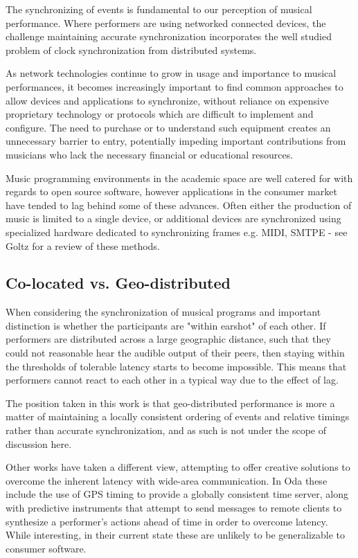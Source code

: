 \documentclass[11pt]{article} %
\theoremstyle{plain}
\theoremstyle{definition}
\begin{document}
The synchronizing of events is fundamental to our perception of musical
performance. Where performers are using networked connected devices, the
challenge maintaining accurate synchronization incorporates the well studied
problem of clock synchronization from distributed systems.

As network technologies continue to grow in usage and importance to musical
performances\cite{madgwick2015simple}, it becomes increasingly important to
find common approaches to allow devices and applications to synchronize, without
reliance on expensive proprietary technology or protocols which are difficult to
implement and configure. The need to purchase or to understand such equipment
creates an unnecessary barrier to entry, potentially impeding important
contributions from musicians who lack the necessary financial or educational
resources.

Music programming environments in the academic space are well catered for with
regards to open source software, however applications in the consumer market
have tended to lag behind some of these advances. Often either the production
of music is limited to a single device, or additional devices are synchronized
using specialized hardware dedicated to synchronizing frames e.g. MIDI, SMTPE -
see Goltz\cite{goltz2018ableton} for a review of these methods.

\subsection{Co-located vs. Geo-distributed}

When considering the synchronization of musical programs and important
distinction is whether the participants are "within earshot" of each other. If
performers are distributed across a large geographic distance, such that they
could not reasonable hear the audible output of their peers, then staying
within the thresholds of tolerable latency starts to become impossible. This
means that performers cannot react to each other in a typical way due to the
effect of lag.

The position taken in this work is that geo-distributed performance is more a
matter of maintaining a locally consistent ordering of events and relative
timings rather than accurate synchronization, and as such is not under the
scope of discussion here.

Other works have taken a different view, attempting to offer creative solutions
to overcome the inherent latency with wide-area communication. In
Oda\cite{oda2017tools} these include the use of GPS timing to provide a
globally consistent time server, along with predictive instruments that attempt
to send messages to remote clients to synthesize a performer's actions ahead of
time in order to overcome latency. While interesting, in their current state
these are unlikely to be generalizable to consumer software.
\end{document}
